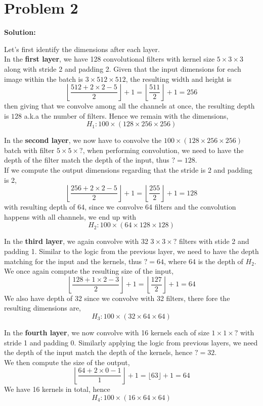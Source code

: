 \documentclass{article}
\newenvironment{solution}
  {\par\noindent\textbf{Solution:}\par}
  {\par}
\begin{document}
\section{Problem 2}
\begin{solution}
  Let's first identify the dimensions after each layer. \\ 
  In the \textbf{first layer}, we have 128 convolutional filters with kernel size $5 \times 3 \times 3$ along with stride 2 and padding 2. 
  Given that the input dimensions for each image within the batch is $3 \times 512 \times 512$, the resulting width and height is 
  \[
\left\lfloor  \frac{512+2 \times 2 -5}{2}  \right\rfloor + 1 = \left\lfloor  \frac{511}{2}  \right\rfloor+1 = 256 
  \]
  then giving that we convolve among all the channels at once, the resulting depth is $128$ a.k.a the number of filters.
  Hence we remain with the dimensions, 
  \[ H_1: 100 \times(128 \times 256 \times 256) \]

  In the \textbf{second layer}, we now have to convolve the $100 \times (128 \times 256 \times 256)$ batch with filter $5 \times 5 \times ?$, 
  when performing convolution, we need to have the depth of the filter match the depth of the input, thus $ ? = 128$.
  \\ 
  If we compute the output dimensions regarding that the stride is 2 and padding is 2,
  \[
\left\lfloor  \frac{256+2\times 2 - 5}{2}  \right\rfloor  + 1 = \left\lfloor  \frac{255}{2}  \right\rfloor +1= 128 
  \]
  with resulting depth of 64, since we convolve 64 filters and the convolution happens with all channels, we end up with 
  \[
    H_2: 100 \times (64 \times 128 \times 128)
  \]

  In the \textbf{third layer}, we again convolve with 32 $3 \times 3 \times ?$ filters with stide 2 and padding 1. Similar to the logic from the previous layer,
  we need to have the depth matching for the input and the kernels, thus $? = 64$, where 64 is the depth of $H_2$. \\ 
  We once again compute the resulting size of the input, 
  \[ \left\lfloor   \frac{128 + 1 \times 2 - 3}{2}  \right\rfloor +1 = \left\lfloor  \frac{127}{2}  \right\rfloor +1 = 64 \]
  We also have depth of 32 since we convolve with 32 filters, there fore the resulting dimensions are, 
  \[ H_3 : 100 \times (32 \times 64 \times 64) \]

  In the \textbf{fourth layer}, we now convolve with 16 kernels each of size $1 \times 1 \times ?$ with stride 1 and padding 0. 
  Similarly applying the logic from previous layers, we need the depth of the input match the depth of the kernels, hence $? = 32$. \\ 
  We then compute the size of the output, 
  \[ 
\left\lfloor  \frac{64 + 2 \times 0 - 1}{1}  \right\rfloor +1= \lfloor 63 \rfloor + 1 = 64 
  \]
  We have 16 kernels in total, hence 
  \[ H_4: 100 \times (16 \times 64 \times 64) \]


\end{solution}
\end{document}
